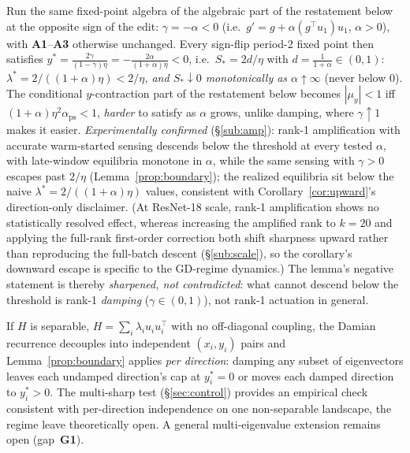 \begin{corollary}
\label{cor:amplify}
Run the same fixed-point algebra of
the algebraic part of the restatement below at the opposite sign of the
edit: $\gamma=-\alpha<0$ (i.e.\ $g'=g+\alpha(g^{\top}u_{1})u_{1}$,
$\alpha>0$), with \textbf{A1}--\textbf{A3} otherwise unchanged. Every
sign-flip period-2 fixed point then satisfies
$y^{*}=\tfrac{2\gamma}{(1-\gamma)\eta}=-\tfrac{2\alpha}{(1+\alpha)\eta}<0$,
i.e.\ $S_{*}=2d/\eta$ with $d=\tfrac{1}{1+\alpha}\in(0,1)$:
\emph{$\lambda^{*}=2/((1+\alpha)\eta)<2/\eta$, and
$S_{*}\downarrow0$ monotonically as $\alpha\uparrow\infty$} (never below
$0$). The conditional $y$-contraction part of the restatement below becomes
$|\mu_{y}|<1$ iff $(1+\alpha)\eta^{2}\alpha_{\mathrm{ps}}<1$, \emph{harder} to satisfy as
$\alpha$ grows, unlike damping, where $\gamma\uparrow1$ makes it easier.
\emph{Experimentally confirmed} (\S\ref{sub:amp}): rank-1 amplification with
accurate warm-started sensing descends below the threshold at every tested $\alpha$, with
late-window equilibria monotone in $\alpha$, while the same sensing with
$\gamma>0$ escapes past $2/\eta$
(Lemma~\ref{prop:boundary}); the realized equilibria sit
below the naive $\lambda^{*}=2/((1{+}\alpha)\eta)$ values, consistent with
Corollary~\ref{cor:upward}'s direction-only disclaimer. (At ResNet-18
scale, rank-1 amplification shows no statistically resolved effect,
whereas increasing the amplified rank to $k{=}20$ and applying the
full-rank first-order correction both shift sharpness upward rather
than reproducing the full-batch descent
(\S\ref{sub:scale}), so the corollary's downward escape is specific
to the GD-regime dynamics.) The lemma's
negative statement is thereby \emph{sharpened, not contradicted}: what cannot
descend below the threshold is rank-1 \emph{damping} ($\gamma\in(0,1)$), not rank-1 actuation
in general.
\end{corollary}

\begin{remark}
\label{rem:separable}
If $H$ is separable, $H=\sum_{i}\lambda_{i}u_{i}u_{i}^{\top}$ with no
off-diagonal coupling, the Damian recurrence decouples into independent
$(x_{i},y_{i})$ pairs and Lemma~\ref{prop:boundary} applies
\emph{per direction}: damping any subset of eigenvectors leaves each undamped
direction's cap at $y_{i}^{*}=0$ or moves each damped direction to
$y_{i}^{*}>0$. The multi-sharp test (\S\ref{sec:control}) provides an
empirical check consistent with per-direction independence on one
non-separable landscape, the regime \citet{damian2023selfstab} leave
theoretically open. A general multi-eigenvalue extension remains open
(gap~\textbf{G1}).
\end{remark}

